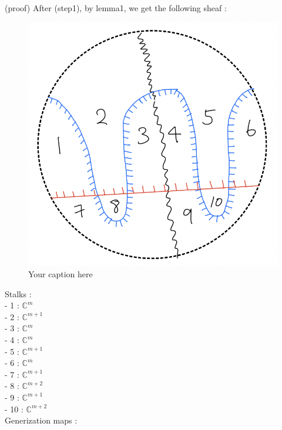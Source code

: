 (proof) After (step1), by lemma1, we get the following sheaf :
\begin{figure}[H] %
    \centering
    \includegraphics[width=\linewidth]{diagrams/lemma5/6.png} %
    \caption{Your caption here}
    \label{fig:your-label}
\end{figure}

Stalks : \\
- 1 : $\mathbb{C}^{m}$\\
- 2 : $\mathbb{C}^{m+1}$\\
- 3 : $\mathbb{C}^{m}$\\
- 4 : $\mathbb{C}^{m}$\\
- 5 : $\mathbb{C}^{m+1}$\\
- 6 : $\mathbb{C}^{m}$\\
- 7 : $\mathbb{C}^{m+1}$\\
- 8 : $\mathbb{C}^{m+2}$\\
- 9 : $\mathbb{C}^{m+1}$\\
- 10 : $\mathbb{C}^{m+2}$\\

Generization maps : \\


